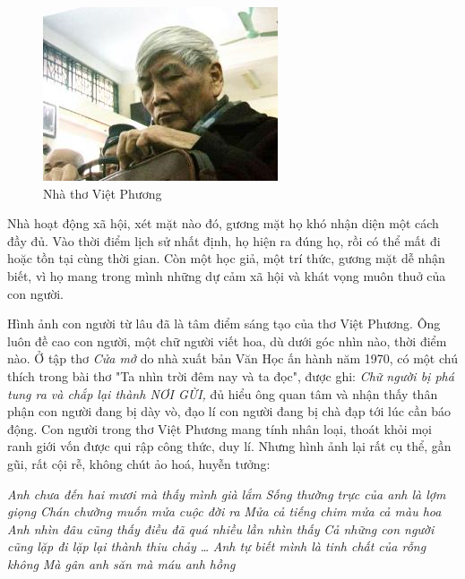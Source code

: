 \documentclass[../main.tex]{subfiles}
\begin{document}
\begin{multicols}{2}

\begin{figure}
	\centering
	\includegraphics[width=\textwidth]{../img/tho210308.jpg}
	\caption{Nhà thơ Việt Phương}
\end{figure}
 Nhà hoạt động xã hội, xét mặt nào đó, gương mặt họ khó nhận diện một cách đầy đủ. Vào thời điểm lịch sử nhất định, họ hiện ra đúng họ, rồi có thể mất đi hoặc tồn tại cùng thời gian. Còn một học giả, một trí thức, gương mặt dễ nhận biết, vì họ mang trong mình những dự cảm xã hội và khát vọng muôn thuở của con người. 
 
Hình ảnh con người từ lâu đã là tâm điểm sáng tạo của thơ Việt Phương. Ông luôn đề cao con người, một chữ người viết hoa, dù dưới góc nhìn nào, thời điểm nào. Ở tập thơ \textit{Cửa mở} do nhà xuất bản Văn Học ấn hành năm 1970, có một chú thích trong bài thơ "Ta nhìn trời đêm nay và ta đọc", được ghi: \textit{Chữ người bị phá tung ra và chắp lại thành NƠI GỪI, }đủ hiểu ông quan tâm và nhận thấy thân phận con người đang bị dày vò, đạo lí con người đang bị chà đạp tới lúc cần báo động. Con người trong thơ Việt Phương mang tính nhân loại, thoát khỏi mọi ranh giới vốn được qui rập công thức, duy lí. Nhưng hình ảnh  lại rất cụ thể, gần gũi, rất cội rễ, không chút ảo hoá, huyễn tưởng: 
\begin{blockquote}
        
\textit{Anh chưa đến hai mươi mà thấy mình già lắm}        
\textit{Sống thường trực của anh là lợm giọng}        
\textit{Chán chường muốn mửa cuộc đời ra}        
\textit{Mửa cả tiếng chim mửa cả màu hoa}        
\textit{Anh nhìn đâu cũng thấy điều đã quá nhiều lần nhìn thấy}        
\textit{Cả những con người cũng lặp đi lặp lại thành thiu chảy}        
\textit{…}        
\textit{Anh tự biết mình là tinh chất của rỗng không} 
\textit{Mà gân anh săn mà máu anh hồng} 


\end{blockquote}
\end{multicols}
\end{document}
